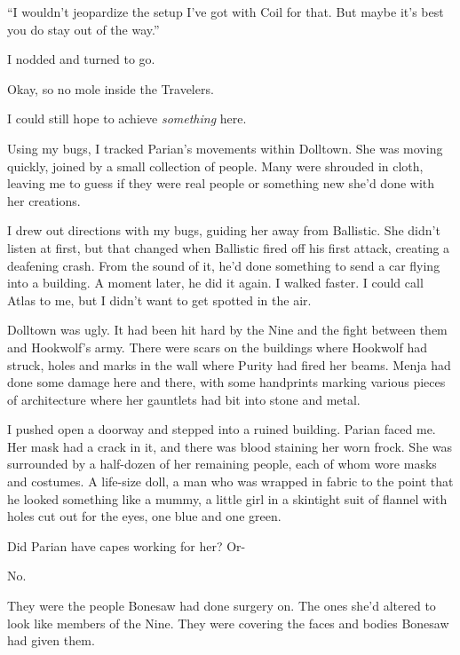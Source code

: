 ``I wouldn't jeopardize the setup I've got with Coil for that.  But maybe it's best you do stay out of the way.''



I nodded and turned to go.



Okay, so no mole inside the Travelers.



I could still hope to achieve \emph{something} here.



Using my bugs, I tracked Parian's movements within Dolltown.  She was moving quickly, joined by a small collection of people.  Many were shrouded in cloth, leaving me to guess if they were real people or something new she'd done with her creations.



I drew out directions with my bugs, guiding her away from Ballistic.  She didn't listen at first, but that changed when Ballistic fired off his first attack, creating a deafening crash.  From the sound of it, he'd done something to send a car flying into a building.  A moment later, he did it again.  I walked faster.  I could call Atlas to me, but I didn't want to get spotted in the air.



Dolltown was ugly.  It had been hit hard by the Nine and the fight between them and Hookwolf's army.  There were scars on the buildings where Hookwolf had struck, holes and marks in the wall where Purity had fired her beams.  Menja had done some damage here and there, with some handprints marking various pieces of architecture where her gauntlets had bit into stone and metal.



I pushed open a doorway and stepped into a ruined building.  Parian faced me.  Her mask had a crack in it, and there was blood staining her worn frock.  She was surrounded by a half-dozen of her remaining people, each of whom wore masks and costumes.  A life-size doll, a man who was wrapped in fabric to the point that he looked something like a mummy, a little girl in a skintight suit of flannel with holes cut out for the eyes, one blue and one green.



Did Parian have capes working for her?  Or-



No.



They were the people Bonesaw had done surgery on.  The ones she'd altered to look like members of the Nine.  They were covering the faces and bodies Bonesaw had given them.



